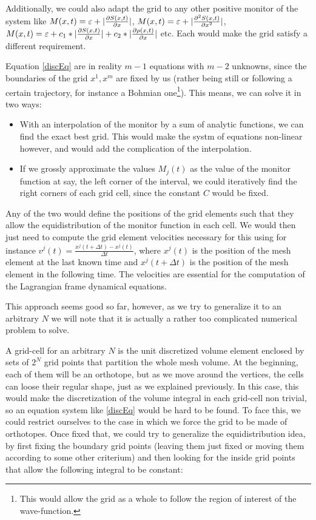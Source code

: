 \documentclass[11pt, a4paper]{article} %
\begin{document}
Additionally, we could also adapt the grid to any other positive monitor of the system like $M(x,t)=\varepsilon+|\pdv{S(x,t)}{x}|$, $M(x,t)=\varepsilon+|\pdv[2]{S(x,t)}{x}|$, $M(x,t)=\varepsilon+c_1*|\pdv{S(x,t)}{x}|+c_2*|\pdv{\rho(x,t)}{x}|$ etc. Each would make the grid satisfy a different requirement.

Equation \eqref{discEq} are in reality $m-1$ equations with $m-2$ unknowns, since the boundaries of the grid $x^1, x^m$ are fixed by us (rather being still or following a certain trajectory, for instance a Bohmian one\footnote{This would allow the grid as a whole to follow the region of interest of the wave-function.}). This means, we can solve it in two ways: 
\begin{itemize}
\item With an interpolation of the monitor by a sum of analytic functions, we can find the exact best grid. This would make the systm of equations non-linear however, and would add the complication of the interpolation.

\item If we grossly approximate the values $M_j(t)$ as the value of the monitor function at say, the left corner of the interval, we could iteratively find the right corners of each grid cell, since the constant $C$ would be fixed.
\end{itemize}

Any of the two would define the positions of the grid elements such that they allow the equidistribution of the monitor function in each cell. We would then just need to compute the grid element velocities necessary for this using for instance $v^j(t)=\frac{x^j(t+\Delta t)-x^j(t)}{\Delta t}$, where $x^j(t)$ is the position of the mesh element at the last known time and $x^j(t+\Delta t)$ is the position of the mesh element in the following time. The velocities are essential for the computation of the Lagrangian frame dynamical equations.

This approach seems good so far, however, as we try to generalize it to an arbitrary $N$ we will note that it is actually a rather too complicated numerical problem to solve.

A grid-cell for an arbitrary $N$ is the unit discretized volume element enclosed by sets of $2^N$ grid points that partition the whole mesh volume. At the beginning, each of them will be an orthotope, but as we move around the vertices, the cells can loose their regular shape, just as we explained previously. In this case, this would make the discretization of the volume integral in each grid-cell non trivial, so an equation system like \eqref{discEq} would be hard to be found. To face this, we could restrict ourselves to the case in which we force the grid to be made of orthotopes. Once fixed that, we could try to generalize the equidistribution idea, by first fixing the boundary grid points (leaving them just fixed or moving them according to some other criterium) and then looking for the inside grid points that allow the following integral to be constant:
\end{document}
